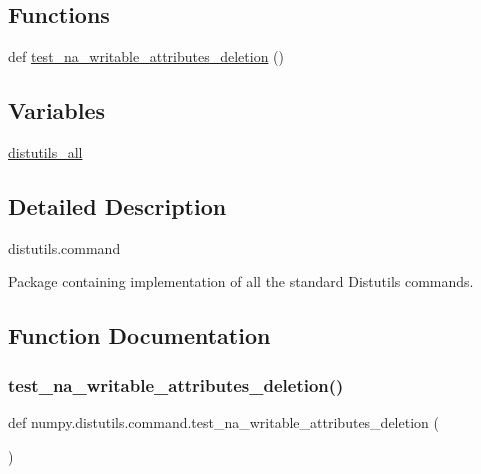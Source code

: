 \subsection*{Functions}
\begin{DoxyCompactItemize}
\item 
def \hyperlink{namespacenumpy_1_1distutils_1_1command_ae53506b299b0bfa7b91bcdea42451e64}{test\+\_\+na\+\_\+writable\+\_\+attributes\+\_\+deletion} ()
\end{DoxyCompactItemize}
\subsection*{Variables}
\begin{DoxyCompactItemize}
\item 
\hyperlink{namespacenumpy_1_1distutils_1_1command_ac3524215abae058021eedd698191336b}{distutils\+\_\+all}
\end{DoxyCompactItemize}


\subsection{Detailed Description}
\begin{DoxyVerb}distutils.command

Package containing implementation of all the standard Distutils
commands.\end{DoxyVerb}
 

\subsection{Function Documentation}
\mbox{\label{namespacenumpy_1_1distutils_1_1command_ae53506b299b0bfa7b91bcdea42451e64}} 
\subsubsection{\texorpdfstring{test\+\_\+na\+\_\+writable\+\_\+attributes\+\_\+deletion()}{test\_na\_writable\_attributes\_deletion()}}
{\footnotesize\ttfamily def numpy.\+distutils.\+command.\+test\+\_\+na\+\_\+writable\+\_\+attributes\+\_\+deletion (\begin{DoxyParamCaption}{ }\end{DoxyParamCaption})}



